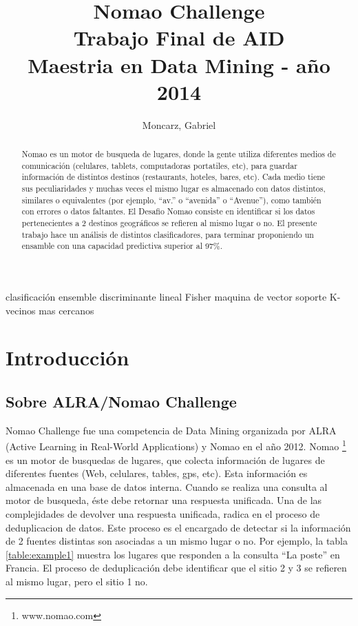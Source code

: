 \documentclass[journal]{IEEEtran}
\begin{document}
\title{  Nomao Challenge \\
	{\large Trabajo Final de AID} \\
	{\large Maestria en Data Mining - año 2014}
} 
\author{Moncarz, Gabriel}
\maketitle %


\begin{abstract}
Nomao es un motor de busqueda de lugares, donde la gente utiliza diferentes medios
de comunicación (celulares, tablets, computadoras portatiles, etc), 
para guardar información de distintos destinos (restaurants, hoteles,
bares, etc). Cada medio tiene sus peculiaridades y muchas veces el mismo lugar
es almacenado con datos distintos, similares o equivalentes (por ejemplo, ``av.'' o
``avenida'' o ``Avenue''), como también con errores o datos faltantes. 
El Desafio Nomao consiste en identificar si los datos pertenecientes
a 2 destinos geográficos se refieren al mismo lugar o no. El presente
trabajo hace un análisis de distintos clasificadores, para terminar
proponiendo un ensamble con una capacidad predictiva superior al 97\%.
\end{abstract}

\begin{IEEEkeywords}
clasificación ensemble discriminante lineal Fisher maquina de vector soporte
K-vecinos mas cercanos
\end{IEEEkeywords}


\section{Introducción}

\subsection{Sobre ALRA/Nomao Challenge}
Nomao Challenge fue una competencia de Data Mining organizada por ALRA 
(Active Learning in Real-World Applications) y Nomao en el año 2012. Nomao 
\footnote{www.nomao.com} es un motor de busquedas de lugares, que colecta
información de lugares de diferentes fuentes (Web, celulares, tables, gps, 
etc). Esta información es almacenada en una base de datos interna. 
Cuando se realiza una consulta al motor de busqueda, éste debe retornar una
respuesta unificada. Una de las complejidades de devolver una
respuesta unificada, radica en el proceso de deduplicacion de datos. Este
proceso es el encargado de detectar si la información de 2 fuentes distintas
son asociadas a un mismo lugar o no. Por ejemplo, la tabla \ref{table:example1}
muestra los lugares que responden a la consulta ``La poste'' en Francia. El
proceso de deduplicación debe identificar que el sitio 2 y 3 se refieren
al mismo lugar, pero el sitio 1 no.
\end{document}
